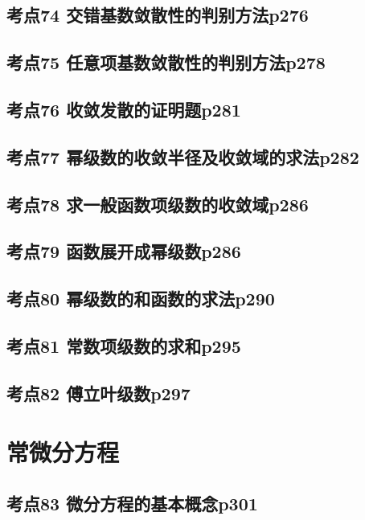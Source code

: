 \section{考点74 交错基数敛散性的判别方法p276}

\section{考点75 任意项基数敛散性的判别方法p278}

\section{考点76 收敛发散的证明题p281}

\section{考点77 幂级数的收敛半径及收敛域的求法p282}

\section{考点78 求一般函数项级数的收敛域p286}

\section{考点79 函数展开成幂级数p286}

\section{考点80 幂级数的和函数的求法p290}

\section{考点81 常数项级数的求和p295}

\section{考点82 傅立叶级数p297}

\chapter{常微分方程}

\section{考点83 微分方程的基本概念p301}

